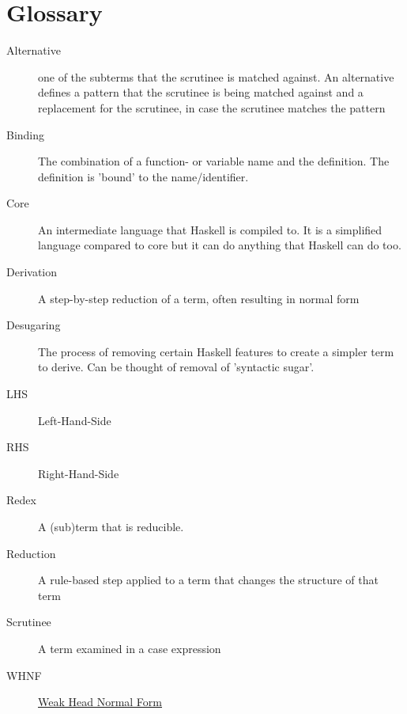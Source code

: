 \newpage

\section*{Glossary}

\begin{description}
    \item[Alternative] one of the subterms that the scrutinee is matched against.
        An alternative defines a pattern that the scrutinee is being matched against
        and a replacement for the scrutinee, in case the scrutinee matches the pattern
    \item[Binding] The combination of a function- or variable name and the definition.
        The definition is 'bound' to the name/identifier.
    \item[Core] An intermediate language that Haskell is compiled to.
        It is a simplified language compared to core but it can do anything that Haskell can do too.
    \item[Derivation] A step-by-step reduction of a term, often resulting in normal form
    \item[Desugaring] The process of removing certain Haskell features to create a simpler term to derive.
        Can be thought of removal of 'syntactic sugar'.
    \item[LHS] Left-Hand-Side 
    \item[RHS] Right-Hand-Side
    \item[Redex] A (sub)term that is reducible.
    \item[Reduction] A rule-based step applied to a term that changes the structure of that term
    \item[Scrutinee] A term examined in a case expression
    \item[WHNF] \href{https://wiki.haskell.org/Weak_head_normal_form#:~:text=An%20expression%20is%20in%20weak,abstraction%20%5Cx%20%2D%3E%20expression%20.}{Weak Head Normal Form}
\end{description}